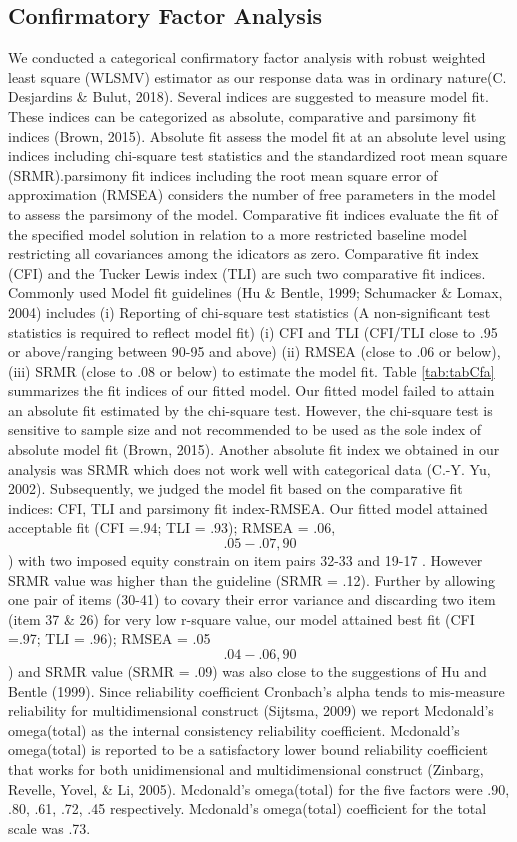 \documentclass[
  english,
  man]{apa6}
\begin{document}
\hypertarget{confirmatory-factor-analysis}{%
\subsection{Confirmatory Factor Analysis}\label{confirmatory-factor-analysis}}

We conducted a categorical confirmatory factor analysis with robust weighted least square (WLSMV) estimator as our response data was in ordinary nature(C. Desjardins \& Bulut, 2018). Several indices are suggested to measure model fit. These indices can be categorized as absolute, comparative and parsimony fit indices (Brown, 2015). Absolute fit assess the model fit at an absolute level using indices including chi-square test statistics and the standardized root mean square (SRMR).parsimony fit indices including the root mean square error of approximation (RMSEA) considers the number of free parameters in the model to assess the parsimony of the model. Comparative fit indices evaluate the fit of the specified model solution in relation to a more restricted baseline model restricting all covariances among the idicators as zero. Comparative fit index (CFI) and the Tucker Lewis index (TLI) are such two comparative fit indices. Commonly used Model fit guidelines (Hu \& Bentle, 1999; Schumacker \& Lomax, 2004) includes (i) Reporting of chi-square test statistics (A non-significant test statistics is required to reflect model fit) (i) CFI and TLI (CFI/TLI close to .95 or above/ranging between 90-95 and above) (ii) RMSEA (close to .06 or below), (iii) SRMR (close to .08 or below) to estimate the model fit. Table \ref{tab:tabCfa} summarizes the fit indices of our fitted model. Our fitted model failed to attain an absolute fit estimated by the chi-square test. However, the chi-square test is sensitive to sample size and not recommended to be used as the sole index of absolute model fit (Brown, 2015). Another absolute fit index we obtained in our analysis was SRMR which does not work well with categorical data (C.-Y. Yu, 2002). Subsequently, we judged the model fit based on the comparative fit indices: CFI, TLI and parsimony fit index-RMSEA. Our fitted model attained acceptable fit (CFI =.94; TLI = .93); RMSEA = .06,\[.05-.07, 90%
\]) with two imposed equity constrain on item pairs 32-33 and 19-17 . However SRMR value was higher than the guideline (SRMR = .12). Further by allowing one pair of items (30-41) to covary their error variance and discarding two item (item 37 \& 26) for very low r-square value, our model attained best fit (CFI =.97; TLI = .96); RMSEA = .05\[.04-.06, 90%
\]) and SRMR value (SRMR = .09) was also close to the suggestions of Hu and Bentle (1999). Since reliability coefficient Cronbach's alpha tends to mis-measure reliability for multidimensional construct (Sijtsma, 2009) we report Mcdonald's omega(total) as the internal consistency reliability coefficient. Mcdonald's omega(total) is reported to be a satisfactory lower bound reliability coefficient that works for both unidimensional and multidimensional construct (Zinbarg, Revelle, Yovel, \& Li, 2005). Mcdonald's omega(total) for the five factors were .90, .80, .61, .72, .45 respectively. Mcdonald's omega(total) coefficient for the total scale was .73.
\end{document}
